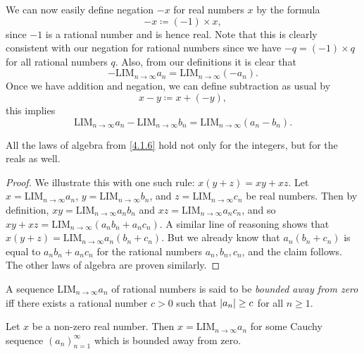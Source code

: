 \begin{note}
  We can now easily define negation \(-x\) for real numbers \(x\) by the formula
  \[
    -x \coloneqq (-1) \times x,
  \]
  since \(-1\) is a rational number and is hence real.
  Note that this is clearly consistent with our negation for rational numbers since we have \(-q = (-1) \times q\) for all rational numbers \(q\).
  Also, from our definitions it is clear that
  \[
    -\text{LIM}_{n \to \infty} a_n = \text{LIM}_{n \to \infty} (-a_n).
  \]
  Once we have addition and negation, we can define subtraction as usual by
  \[
    x - y \coloneqq x + (-y),
  \]
  this implies
  \[
    \text{LIM}_{n \to \infty} a_n - \text{LIM}_{n \to \infty} b_n = \text{LIM}_{n \to \infty} (a_n - b_n).
  \]
\end{note}

\begin{proposition}\label{5.3.11}
  All the laws of algebra from \cref{4.1.6} hold not only for the integers, but for the reals as well.
\end{proposition}

\begin{proof}
  We illustrate this with one such rule: \(x(y + z) = xy + xz\).
  Let \(x = \text{LIM}_{n \to \infty} a_n\), \(y = \text{LIM}_{n \to \infty} b_n\), and \(z = \text{LIM}_{n \to \infty} c_n\) be real numbers.
  Then by definition, \(xy = \text{LIM}_{n \to \infty} a_n b_n\) and \(xz = \text{LIM}_{n \to \infty} a_n c_n\), and so \(xy + xz = \text{LIM}_{n \to \infty} (a_n b_n + a_n c_n)\).
  A similar line of reasoning shows that \(x(y + z) = \text{LIM}_{n \to \infty} a_n (b_n + c_n)\).
  But we already know that \(a_n (b_n + c_n)\) is equal to \(a_n b_n + a_n c_n\) for the rational numbers \(a_n, b_n, c_n\), and the claim follows.
  The other laws of algebra are proven similarly.
\end{proof}

\begin{definition}\label{5.3.12}
  A sequence \(\text{LIM}_{n \to \infty} a_n\) of rational numbers is said to be \emph{bounded away from zero} iff there exists a rational number \(c > 0\) such that \(\left\lvert a_n\right\rvert \geq c\) for all \(n \geq 1\).
\end{definition}

\setcounter{theorem}{13}
\begin{lemma}\label{5.3.14}
  Let \(x\) be a non-zero real number.
  Then \(x = \text{LIM}_{n \to \infty} a_n\) for some Cauchy sequence \((a_n)_{n = 1}^{\infty}\) which is bounded away from zero.
\end{lemma}

